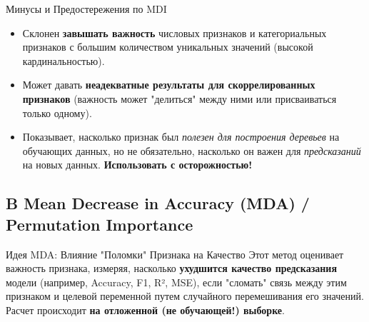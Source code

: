 \begin{alerttextbox}{Минусы и Предостережения по MDI}
    \begin{itemize}[nosep, leftmargin=*]
        \item Склонен \textbf{завышать важность} числовых признаков и категориальных признаков с большим количеством уникальных значений (высокой кардинальностью).
        \item Может давать \textbf{неадекватные результаты для скоррелированных признаков} (важность может "делиться" между ними или присваиваться только одному).
        \item Показывает, насколько признак был \textit{полезен для построения деревьев} на обучающих данных, но не обязательно, насколько он важен для \textit{предсказаний} на новых данных. \textbf{Использовать с осторожностью!}
    \end{itemize}
\end{alerttextbox}

\subsection{B Mean Decrease in Accuracy (MDA) / Permutation Importance}

\begin{myblock}{Идея MDA: Влияние "Поломки" Признака на Качество}
    Этот метод оценивает важность признака, измеряя, насколько \textbf{ухудшится качество предсказания} модели (например, Accuracy, F1, R², MSE), если "сломать" связь между этим признаком и целевой переменной путем случайного перемешивания его значений. Расчет происходит \textbf{на отложенной (не обучающей!) выборке}.
\end{myblock}


